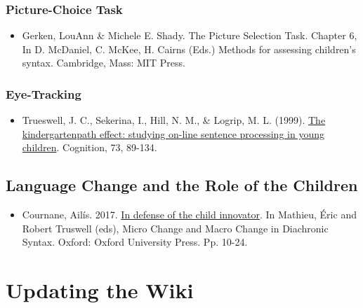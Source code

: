 \documentclass[
]{book}
\providecommand{\tightlist}{%
  \setlength{\itemsep}{0pt}\setlength{\parskip}{0pt}}
\begin{document}
\hypertarget{picture-choice-task}{%
\subsection*{Picture-Choice Task}\label{picture-choice-task}}

\begin{itemize}
\tightlist
\item
  Gerken, LouAnn \& Michele E. Shady. The Picture Selection Task. Chapter 6, In D. McDaniel, C. McKee, H. Cairns (Eds.) Methods for assessing children's syntax. Cambridge, Mass: MIT Press.
\end{itemize}

\hypertarget{eye-tracking}{%
\subsection*{Eye-Tracking}\label{eye-tracking}}

\begin{itemize}
\tightlist
\item
  Trueswell, J. C., Sekerina, I., Hill, N. M., \& Logrip, M. L. (1999). \href{https://cpb-us-w2.wpmucdn.com/web.sas.upenn.edu/dist/4/81/files/2017/07/1999_Cognition73_89-134-1sw5y3i.pdf}{The kindergartenpath effect: studying on-line sentence processing in young children}. Cognition, 73, 89-134.
\end{itemize}

\hypertarget{language-change-and-the-role-of-the-children}{%
\section{Language Change and the Role of the Children}\label{language-change-and-the-role-of-the-children}}

\begin{itemize}
\tightlist
\item
  Cournane, Ailís. 2017. \href{https://s18798.pcdn.co/cournane/wp-content/uploads/sites/5271/2018/04/In_defence_of_the_child_innovator.pdf}{In defense of the child innovator}. In Mathieu, Éric and Robert Truswell (eds), Micro Change and Macro Change in Diachronic Syntax. Oxford: Oxford University Press. Pp. 10-24.
\end{itemize}

\hypertarget{updating-the-wiki}{%
\chapter{Updating the Wiki}\label{updating-the-wiki}}
\end{document}

